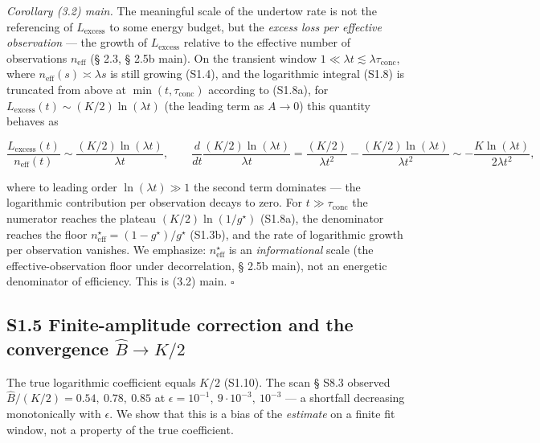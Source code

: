 \documentclass[12pt]{iopart}
\providecommand{\texorpdfstring}[2]{#1}
\begin{document}
\emph{Corollary (3.2) main.} The meaningful scale of the undertow rate is not the referencing of \(L_{\text{excess}}\) to some energy budget, but the \emph{excess loss per effective observation} --- the growth of \(L_{\text{excess}}\) relative to the effective number of observations \(n_{\text{eff}}\) (§ 2.3, § 2.5b main). On the transient window \(1\ll\lambda t\lesssim\lambda\tau_{\text{conc}}\), where \(n_{\text{eff}}(s)\asymp\lambda s\) is still growing (S1.4), and the logarithmic integral (S1.8) is truncated from above at \(\min(t,\tau_{\text{conc}})\) according to (S1.8a), for \(L_{\text{excess}}(t) \sim (K/2)\ln(\lambda t)\) (the leading term as \(A \to 0\)) this quantity behaves as



\[\frac{L_{\text{excess}}(t)}{n_{\text{eff}}(t)} \sim \frac{(K/2)\ln(\lambda t)}{\lambda t}, \qquad \frac{d}{dt}\frac{(K/2)\ln(\lambda t)}{\lambda t} = \frac{(K/2)}{\lambda t^2} - \frac{(K/2)\ln(\lambda t)}{\lambda t^2} \sim -\frac{K\ln(\lambda t)}{2\lambda t^2},\]



where to leading order \(\ln(\lambda t) \gg 1\) the second term dominates --- the logarithmic contribution per observation decays to zero. For \(t\gg\tau_{\text{conc}}\) the numerator reaches the plateau \((K/2)\ln(1/g^\star)\) (S1.8a), the denominator reaches the floor \(n_{\text{eff}}^\star = (1-g^\star)/g^\star\) (S1.3b), and the rate of logarithmic growth per observation vanishes. We emphasize: \(n_{\text{eff}}^\star\) is an \emph{informational} scale (the effective-observation floor under decorrelation, § 2.5b main), not an energetic denominator of efficiency. This is (3.2) main. \(\square\)



\subsection{\texorpdfstring{S1.5 Finite-amplitude correction and the convergence \(\hat B \to K/2\)}{S1.5 Finite-amplitude correction and the convergence \textbackslash hat B \textbackslash to K/2}}\label{s1.5-finite-amplitude-correction-and-the-convergence-hat-b-to-k2}



The true logarithmic coefficient equals \(K/2\) (S1.10). The scan § S8.3 \cite{Andriishin2026b} observed \(\hat B/(K/2) = 0.54,\ 0.78,\ 0.85\) at \(\epsilon = 10^{-1},\ 9\cdot10^{-3},\ 10^{-3}\) --- a shortfall decreasing monotonically with \(\epsilon\). We show that this is a bias of the \emph{estimate} on a finite fit window, not a property of the true coefficient.
\end{document}
